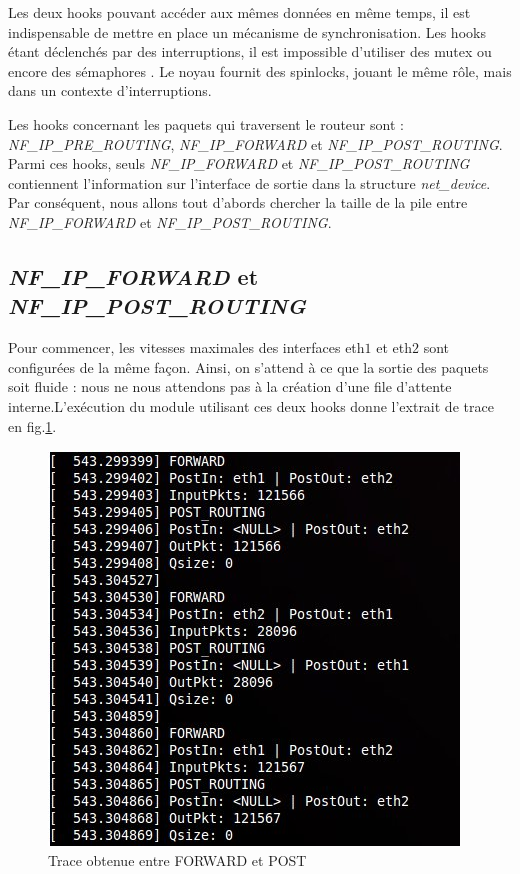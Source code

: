 \documentclass[a4paper]{article}
\begin{document}
Les deux hooks pouvant accéder aux mêmes données en même temps,
il est indispensable de mettre en place un mécanisme de
synchronisation. Les hooks étant déclenchés par des interruptions,
il est impossible d'utiliser des mutex ou encore des sémaphores \cite{mutex}.
Le noyau fournit des spinlocks, jouant le même rôle, mais dans
un contexte d'interruptions. \cite{lock}

Les hooks concernant les paquets qui traversent le routeur sont :
\textit{NF\_IP\_PRE\_ROUTING}, \textit{NF\_IP\_FORWARD} et
\textit{NF\_IP\_POST\_ROUTING}. Parmi ces hooks, seuls
\textit{NF\_IP\_FORWARD} et \textit{NF\_IP\_POST\_ROUTING}
contiennent l'information sur l'interface de sortie dans la
structure \textit{net\_device}. Par conséquent, nous allons
tout d'abords chercher la taille de la pile entre
\textit{NF\_IP\_FORWARD} et \textit{NF\_IP\_POST\_ROUTING}.

\subsection{\textit{NF\_IP\_FORWARD} et \textit{NF\_IP\_POST\_ROUTING}}
Pour commencer, les vitesses maximales des interfaces eth$1$ et
eth$2$ sont configurées de la même façon. Ainsi, on s'attend à
ce que la sortie des paquets soit fluide : nous ne nous attendons
pas à la création d'une file d'attente interne.L'exécution du module
utilisant ces deux hooks donne l'extrait de trace en
fig.\ref{forwardpost}.

\begin{figure}[!ht]
	\centering
	\includegraphics[scale=.5]{forward_post.jpg}
	\caption{\label{forwardpost} Trace obtenue entre FORWARD et POST}
\end{figure}
\end{document}
